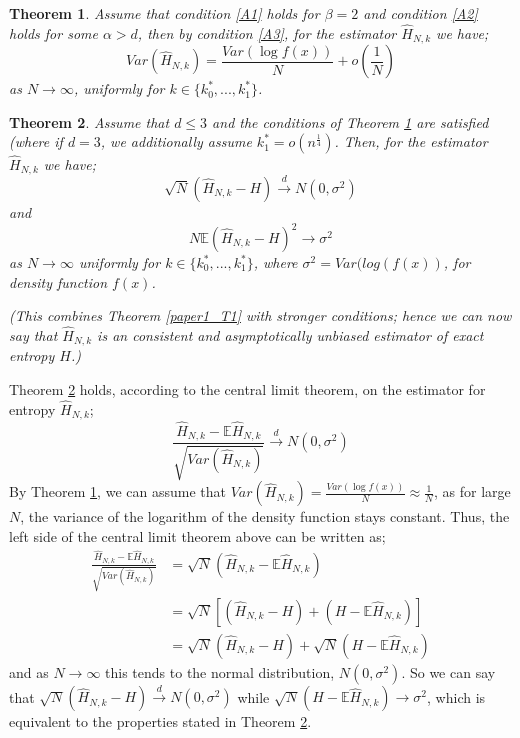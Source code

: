 \documentclass{article}
\newtheorem{theorem}{Theorem}
\begin{document}
\begin{theorem}\label{paper4_T4}
Assume that condition \ref{A1} holds for $\beta = 2$ and condition \ref{A2} holds for some $\alpha > d$, then by condition \ref{A3}, for the estimator $\hat{H}_{N, k}$ we have;
\begin{equation}
Var(\hat{H}_{N, k}) = \frac{Var(\log f(x))}{N} + o(\frac{1}{N}) \nonumber
\end{equation}
as $N \to \infty$, uniformly for $k \in \{ k_{0}^{*}, ...,  k_{1}^{*} \}$.
\end{theorem}

\begin{theorem} \label{paper4_T5}
Assume that $d \leq 3$ and the conditions of Theorem \ref{paper4_T4} are satisfied (where if $d=3$, we additionally assume $k_{1}^{*} = o(n^{\frac{1}{4}})$. Then, for the estimator $\hat{H}_{N, k}$ we have;
\begin{equation} \label{est_dist}
\sqrt{N}(\hat{H}_{N, k} - H) \xrightarrow{d} N(0, \sigma^2)
\end{equation}
and 
\begin{equation} \label{est_consist}
N \mathbb{E}{(\hat{H}_{N, k} - H)^2} \xrightarrow{} \sigma^2
\end{equation}
as $N \to \infty$ uniformly for $k \in \{ k_{0}^{*}, ...,  k_{1}^{*} \}$, where $\sigma^2 = Var(log(f(x))$, for density function $f(x)$.

(This combines Theorem \ref{paper1_T1} with stronger conditions; hence we can now say that $\hat{H}_{N, k}$ is an consistent and asymptotically unbiased estimator of exact entropy $H$.)
\end{theorem}

Theorem \ref{paper4_T5} holds, according to the central limit theorem, on the estimator for entropy $\hat{H}_{N, k}$;
\begin{equation}
\frac{\hat{H}_{N, k} - \mathbb{E}{\hat{H}_{N, k}}}{\sqrt{Var(\hat{H}_{N, k})}} \xrightarrow{d} N(0, \sigma^2) \nonumber
\end{equation}
By Theorem \ref{paper4_T4}, we can assume that $Var(\hat{H}_{N, k}) = \frac{Var(\log f(x))}{N} \approx \frac{1}{N}$, as for large $N$, the variance of the logarithm of the density function stays constant. Thus, the left side of the central limit theorem above can be written as;
\begin{align*}
\frac{\hat{H}_{N, k} - \mathbb{E}{\hat{H}_{N, k}}}{\sqrt{Var(\hat{H}_{N, k})}} &= \sqrt{N}(\hat{H}_{N, k} - \mathbb{E}{\hat{H}_{N, k}}) \\
&= \sqrt{N}[(\hat{H}_{N, k} - H) + (H - \mathbb{E}{\hat{H}_{N, k}})] \\
&= \sqrt{N}(\hat{H}_{N, k} - H) + \sqrt{N}(H - \mathbb{E}{\hat{H}_{N, k}})
\end{align*}
and as $N \to \infty$ this tends to the normal distribution, $N(0, \sigma^2)$. So we can say that $\sqrt{N}(\hat{H}_{N, k} - H) \xrightarrow{d} N(0, \sigma^2)$ while $\sqrt{N} (H - \mathbb{E}{\hat{H}_{N, k}}) \to \sigma^2$, which is equivalent to the properties stated in Theorem \ref{paper4_T5}.
\end{document}
